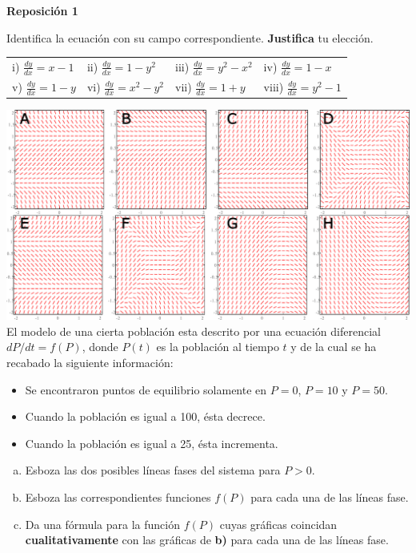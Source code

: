 \documentclass[12pt]{exam}
\begin{document}
\centering


\Large 
\textbf{\huge Reposición 1 \\ \large }

\small
\vskip10pt
\normalsize

\pointformat{\bfseries\boldmath(\thepoints)}
\vskip10pt

    
    \begin{questions}
     \question
     Identifica la ecuación con su campo correspondiente. \textbf{Justifica} tu elección.
     
     \begin{tabular}{llll}
       i) $\frac{dy}{dx}=x-1$   & ii) $\frac{dy}{dx}=1-y^2$ & iii) $\frac{dy}{dx}=y^2-x^2$ & iv) $\frac{dy}{dx}=1-x$ \\
         v) $\frac{dy}{dx}=1-y$ & vi) $\frac{dy}{dx}=x^2-y^2$ & vii) $\frac{dy}{dx}=1+y$ & viii) $\frac{dy}{dx}=y^2-1$
     \end{tabular}
     
     \includegraphics[scale=.48]{F1T1.pdf}
     \question
     El modelo de una cierta población esta descrito por una ecuación diferencial $dP/dt=f(P)$, donde $P(t)$ es la población al tiempo $t$ y de la cual se ha recabado la siguiente información:
     
     \begin{itemize}
         \item Se encontraron puntos de equilibrio solamente en $P=0$, $P=10$ y $P=50$.
         \item Cuando la población es igual a 100, ésta decrece.
         \item Cuando la población es igual a 25, ésta incrementa.
     \end{itemize}
     
     \begin{enumerate}[a)]
         \item Esboza las dos posibles líneas fases del sistema para $P>0$.
         \item Esboza las correspondientes funciones $f(P)$ para cada una de las líneas fase.
         \item Da una fórmula para la función $f(P)$ cuyas gráficas coincidan \textbf{cualitativamente} con las gráficas de \textbf{b)} para cada una de las líneas fase.
     \end{enumerate}


\end{questions}
\end{document}
